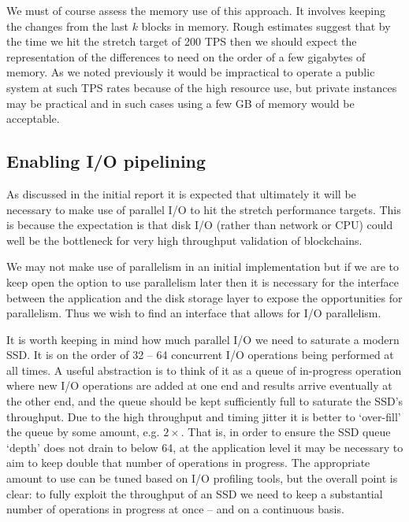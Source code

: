 \documentclass[11pt,a4paper]{article}
\begin{document}
We must of course assess the memory use of this approach. It involves keeping
the changes from the last $k$ blocks in memory. Rough estimates suggest that
by the time we hit the stretch target of 200 TPS then we should expect the
representation of the differences to need on the order of a few gigabytes of
memory. As we noted previously \citep[section 3.3.5]{utxo-db} it would be
impractical to operate a public system at such TPS rates because of the high
resource use, but private instances may be practical and in such cases using a
few GB of memory would be acceptable.


\subsection{Enabling I/O pipelining}
\label{enabling-pipelining}

As discussed in the initial report \citep[sections 6.1 and 8.8]{utxo-db} it is
expected that ultimately it will be necessary to make use of parallel I/O to
hit the stretch performance targets. This is because the expectation is that
disk I/O (rather than network or CPU) could well be the bottleneck for very
high throughput validation of blockchains.

We may not make use of parallelism in an initial implementation but if we are
to keep open the option to use parallelism later then it is necessary for the
interface between the application and the disk storage layer to expose the
opportunities for parallelism. Thus we wish to find an interface that allows
for I/O parallelism.

It is worth keeping in mind how much parallel I/O we need to saturate a modern
SSD. It is on the order of 32 -- 64 concurrent I/O operations being performed
at all times. A useful abstraction is to think of it as a queue of in-progress
operation where new I/O operations are added at one end and results arrive
eventually at the other end, and the queue should be kept sufficiently full to
saturate the SSD's throughput. Due to the high throughput and timing jitter it
is better to `over-fill' the queue by some amount, e.g. $2\times$. That is, in
order to ensure the SSD queue `depth' does not drain to below 64, at the
application level it may be necessary to aim to keep double that number of
operations in progress. The appropriate amount to use can be tuned based on I/O
profiling tools, but the overall point is clear: to fully exploit the
throughput of an SSD we need to keep a substantial number of operations in
progress at once -- and on a continuous basis.
\end{document}
